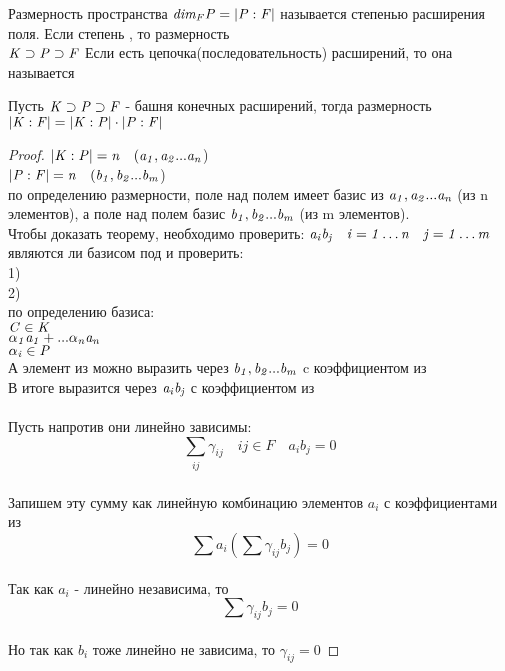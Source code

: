 \begin{defin}
	Размерность пространства $\mathit{dim_{F}P = |P:F|}$ называется степенью
	расширения поля. Если степень , то размерность
	 \\
	$\mathit {K \supset P \supset F}$ Если есть цепочка(последовательность)
	расширений, то она называется 
\end{defin}

\begin{theorem}
	Пусть $\mathit {K \supset P \supset F}$ - башня конечных расширений, тогда
	размерность $\mathit {|K:F|=|K:P|\cdot |P:F|}$
\end{theorem}

\begin{proof}
	$\mathit {|K:P|=n \quad (a_{1}, a_{2}...a_{n}}$) \\
	$\mathit {|P:F|=n \quad (b_{1}, b_{2}...b_{m}}$) \\
	по определению размерности, поле  над полем  имеет базис из
	$\mathit {a_{1}, a_{2}...a_{n}}$ (из n элементов), а поле  над полем 
	базис $\mathit {b_{1}, b_{2}...b_{m}}$ (из m элементов). \\
	Чтобы доказать теорему, необходимо проверить: $\mathit{a_i b_j \quad i = 1 \ldots
	n \quad j = 1 \ldots m}$ \\
	являются ли базисом  под  и проверить: \\
	1)  \\
	2)  \\
	по определению базиса: \\
	$\mathit {C \in K}$ \\
	$\mathit {\alpha_{1} a_{1}+...\alpha_{n}a_{n}}$\\
	$\mathit{\alpha_{i} \in P}$ \\
	А элемент из  можно выразить через $\mathit {b_{1}, b_{2}...b_{m}}$ c
	коэффициентом из  \\
	В итоге  выразится через $\mathit{a_{i}b_{j}}$ с коэффициентом из  \\

	\\
	Пусть напротив они линейно зависимы: \\
	\[ \sum_{\substack {ij}} \gamma_{ij} \quad ij \in F \quad a_{i}b_{j} = 0\] \\
	Запишем эту сумму как линейную комбинацию элементов $a_i$ с коэффициентами из
	 \\
	\[ \sum a_{i} \left ( \sum \gamma_{ij} b_{j} \right) = 0 \] \\
	Так как $a_{i}$ - линейно независима, то \\
	\[\sum \gamma_{ij} b_{j} = 0\] \\
	Но так как $b_{i}$ тоже линейно не зависима, то $\gamma_{ij}=0$
\end{proof}

